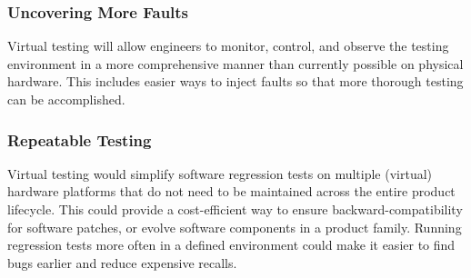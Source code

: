 \subsubsection*{Uncovering More Faults}
Virtual testing will allow engineers to monitor, control, and observe the testing environment in a more comprehensive manner than currently possible on physical hardware.
This includes easier ways to inject faults so that more thorough testing can be accomplished.

\subsubsection*{Repeatable Testing}
Virtual testing would simplify software regression tests on multiple (virtual) hardware platforms
that do not need to be maintained across the entire product lifecycle.
This could provide a cost-efficient way to ensure backward-compatibility for software patches,
or evolve software components in a product family.
Running regression tests more often in a defined environment could make it easier to find bugs earlier and reduce expensive recalls.



